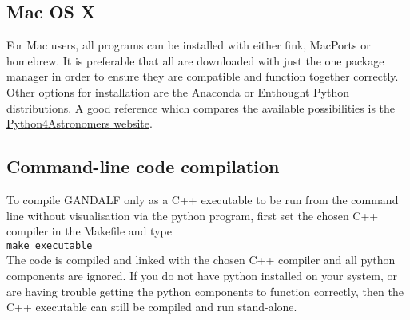 \documentclass[a4paper]{article}
\newcommand{\var}[1]{\texttt{#1}}
\begin{document}
\subsection{Mac OS X}
For Mac users, all programs can be installed with either fink, MacPorts or homebrew.  It is preferable that all are downloaded with just the one package manager in order to ensure they are compatible and function together correctly. Other options for installation are the Anaconda or Enthought Python distributions. A good reference which compares the available possibilities is the \href{http://python4astronomers.github.io/installation/recommended_options.html}{Python4Astronomers website}.



\subsection{Command-line code compilation}

To compile GANDALF only as a C++ executable to be run from the command line without visualisation via the python program, first set the chosen C++ compiler in the Makefile and type \\
\newline
\noindent \var{make executable} \\

\noindent The code is compiled and linked with the chosen C++ compiler and all python components are ignored.  If you do not have python installed on your system, or are having trouble getting the python components to function correctly, then the C++ executable can still be compiled and run stand-alone.


\end{document}
